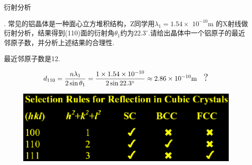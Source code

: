 \documentclass{beamer}
\begin{document}
\begin{frame}[t]{衍射分析}

    {
    . 常见的铝晶体是一种面心立方堆积结构，Z同学用$\lambda_1 =1.54\times  $ $10 ^{-10}$m 的X射线做衍射分析，结果得到(110)面的衍射角$\theta_1$约为$22.3^{\circ}$.请给出晶体中一个铝原子的最近邻原子数，并分析上述结果的合理性.
    } 
    
    \vspace{0.1cm}
    最近邻原子数是12.\par
    \vspace{-0.3cm}
    \[
    d_{110}=\frac{n\lambda_1}{2\sin\theta_1}=\frac{1\times1.54\times10^{-10}}{2\sin22.3^\circ}\approx2.86\times10^{-10} \text{m} \quad \text{\Large ?}
    \]
    \vspace{-0.5cm}
    \begin{figure}
        \centering
        \includegraphics[width=0.7\linewidth]{4.png}

    \end{figure}
\end{frame}
\end{document}
